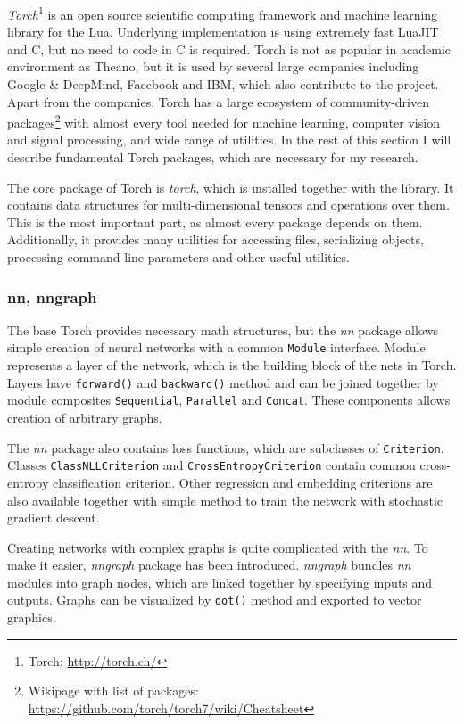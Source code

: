\emph{Torch}\footnote{Torch: \url{http://torch.ch/}} is an open source scientific computing framework and machine learning library for the Lua. Underlying implementation is using extremely fast LuaJIT and C, but no need to code in C is required. Torch is not as popular in academic environment as Theano, but it is used by several large companies including Google \& DeepMind, Facebook and IBM, which also contribute to the project. Apart from the companies, Torch has a large ecosystem of community-driven packages\footnote{Wikipage with list of packages: \url{https://github.com/torch/torch7/wiki/Cheatsheet}} with almost every tool needed for machine learning, computer vision and signal processing, and wide range of utilities. In the rest of this section I will describe fundamental Torch packages, which are necessary for my research.

The core package of Torch is \emph{torch}, which is installed together with the library. It contains data structures for multi-dimensional tensors and operations over them. This is the most important part, as almost every package depends on them. Additionally, it provides many utilities for accessing files, serializing objects, processing command-line parameters and other useful utilities.

\subsubsection{nn, nngraph}

The base Torch provides necessary math structures, but the \emph{nn} package allows simple creation of neural networks with a common \texttt{Module} interface. Module represents a layer of the network, which is the building block of the nets in Torch. Layers have \texttt{forward()} and \texttt{backward()} method and can be joined together by module composites \texttt{Sequential}, \texttt{Parallel} and \texttt{Concat}. These components allows creation of arbitrary graphs.

The \emph{nn} package also contains loss functions, which are subclasses of \texttt{Criterion}. Classes \texttt{ClassNLLCriterion} and \texttt{CrossEntropyCriterion} contain common cross-entropy classification criterion. Other regression and embedding criterions are also available together with simple method to train the network with stochastic gradient descent.

Creating networks with complex graphs is quite complicated with the \emph{nn}. To make it easier, \emph{nngraph} package has been introduced. \emph{nngraph} bundles \emph{nn} modules into graph nodes, which are linked together by specifying inputs and outputs. Graphs can be visualized by \texttt{dot()} method and exported to vector graphics.


